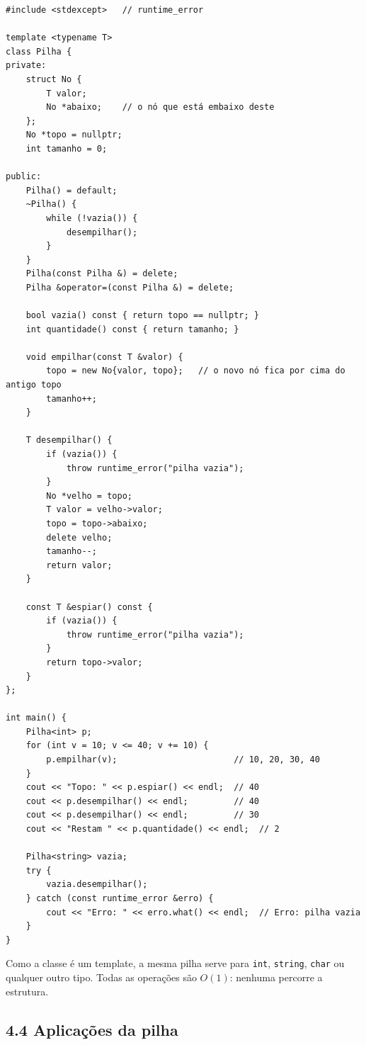 \begin{codigo}
\begin{Verbatim}[breaklines=true, breaksymbolleft={}, fontsize=\footnotesize]
#include <stdexcept>   // runtime_error

template <typename T>
class Pilha {
private:
    struct No {
        T valor;
        No *abaixo;    // o nó que está embaixo deste
    };
    No *topo = nullptr;
    int tamanho = 0;

public:
    Pilha() = default;
    ~Pilha() {
        while (!vazia()) {
            desempilhar();
        }
    }
    Pilha(const Pilha &) = delete;
    Pilha &operator=(const Pilha &) = delete;

    bool vazia() const { return topo == nullptr; }
    int quantidade() const { return tamanho; }

    void empilhar(const T &valor) {
        topo = new No{valor, topo};   // o novo nó fica por cima do antigo topo
        tamanho++;
    }

    T desempilhar() {
        if (vazia()) {
            throw runtime_error("pilha vazia");
        }
        No *velho = topo;
        T valor = velho->valor;
        topo = topo->abaixo;
        delete velho;
        tamanho--;
        return valor;
    }

    const T &espiar() const {
        if (vazia()) {
            throw runtime_error("pilha vazia");
        }
        return topo->valor;
    }
};

int main() {
    Pilha<int> p;
    for (int v = 10; v <= 40; v += 10) {
        p.empilhar(v);                       // 10, 20, 30, 40
    }
    cout << "Topo: " << p.espiar() << endl;  // 40
    cout << p.desempilhar() << endl;         // 40
    cout << p.desempilhar() << endl;         // 30
    cout << "Restam " << p.quantidade() << endl;  // 2

    Pilha<string> vazia;
    try {
        vazia.desempilhar();
    } catch (const runtime_error &erro) {
        cout << "Erro: " << erro.what() << endl;  // Erro: pilha vazia
    }
}
\end{Verbatim}
\end{codigo}

Como a classe é um template, a mesma pilha serve para \texttt{int}, \texttt{string}, \texttt{char} ou qualquer outro tipo. Todas as operações são $O(1)$: nenhuma percorre a estrutura.

\subsection{4.4 Aplicações da pilha}

